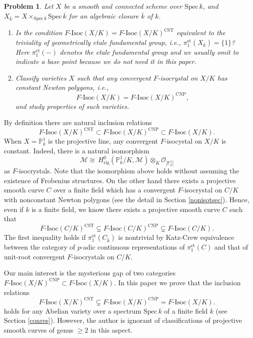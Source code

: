 \documentclass[11pt]{amsart}
\newtheorem{problem}[Lemma]{Problem}
\begin{document}
\begin{problem}\label{prob} Let $X$ be a smooth and connected scheme over $\mathrm{Spec}\, k$, 
and $X_{\overline{k}} = X \times_{\mathrm{Spec}\, k} \mathrm{Spec}\, \overline{k}$ for an algebraic closure 
$\overline{k}$ of $k$. 
\begin{enumerate}
\item Is the condition $F\mbox{-}\mathrm{Isoc}(X/K) = F\mbox{-}\mathrm{Isoc}(X/K)^{\mathrm{CST}}$ 
equivalent to the triviality of geometrically etale fundamental group, i.e., $\pi_1^{\mathrm{et}}(X_{\overline{k}}) = \{ 1\}$?
Here $\pi_1^{\mathrm{et}}(-)$ denotes the etale fundamental group 
and we usually omit to indicate a base point because we do not need it in this paper. 
\item Classify varieties $X$ such that any convergent $F$-isocrystal on $X/K$ has constant Newton polygons, 
i.e., 
$$
        F\mbox{-}\mathrm{Isoc}(X/K) = F\mbox{-}\mathrm{Isoc}(X/K)^{\mathrm{CNP}}, 
$$
and study properties of such varieties. 
\end{enumerate}
\end{problem}

By definition there are natural inclusion relations 
$$
     F\mbox{-}\mathrm{Isoc}(X/K)^{\mathrm{CST}} \subset 
     F\mbox{-}\mathrm{Isoc}(X/K)^{\mathrm{CNP}} \subset 
     F\mbox{-}\mathrm{Isoc}(X/K). 
$$
When $X = \mathbb P^1_k$ is the projective line, any convergent $F$-isocystal on $X/K$ is constant. 
Indeed, there is a natural isomorphism 
$$
      \mathcal M \cong\, H^0_{\mathrm{rig}}(\mathbb P^1_k/K, \mathcal M) \otimes_K \mathcal O_{]\mathbb P^1_k[}
$$
as $F$-isocrystals. Note that the isomorphism above holds without 
assuming the existence of Frobenius structures. 
On the other hand 
there exists a projective smooth curve $C$ over a finite field 
which has a convergent $F$-isocrystal on $C/K$ 
with nonconstant Newton polygons (see the detail in Section \ref{nonisotsec}). 
Hence, even if $k$ is a finite field, 
we know there exists a projective smooth curve $C$ such that 
$$
   F\mbox{-}\mathrm{Isoc}(C/K)^{\mathrm{CST}} \subsetneq F\mbox{-}\mathrm{Isoc}(C/K)^{\mathrm{CNP}} \subsetneq 
     F\mbox{-}\mathrm{Isoc}(C/K). 
$$ 
The first inequality holds if $\pi_1^{\mathrm{et}}(C_{\overline{k}})$ 
is nontrivial by Katz-Crew equivalence \cite[Theorem 2.1]{Cr} between 
the category of 
$p$-adic continuous representations of $\pi_1^{\mathrm{et}}(C)$ and 
that of unit-root convergent $F$-isocrystals on $C/K$. 

Our main interest is the mysterious gap 
of two categories $F\mbox{-}\mathrm{Isoc}(X/K)^{\mathrm{CNP}} \subset F\mbox{-}\mathrm{Isoc}(X/K)$. 
In this paper we prove that the inclusion relations 
$$
   F\mbox{-}\mathrm{Isoc}(X/K)^{\mathrm{CST}} \subsetneq F\mbox{-}\mathrm{Isoc}(X/K)^{\mathrm{CNP}} = 
     F\mbox{-}\mathrm{Isoc}(X/K). 
$$
holds for any Abelian variety over a spectrum $\mathrm{Spec}\, k$ of a finite field $k$ (see Section \ref{conres}). 
However, the author is ignorant of classifications of projective smooth curves of genus $\geq 2$ 
in this aspect. 
\end{document}
